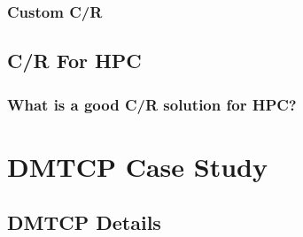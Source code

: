 \documentclass[compress]{beamer}
\begin{document}

\begin{frame}
\frametitle{Custom C/R}



\end{frame}



\subsection{C/R For HPC}      %


\begin{frame}
\frametitle{What is a good C/R solution for HPC?}




\end{frame}



\section{DMTCP Case Study}    %

\subsection{DMTCP Details}    %

\end{document}

